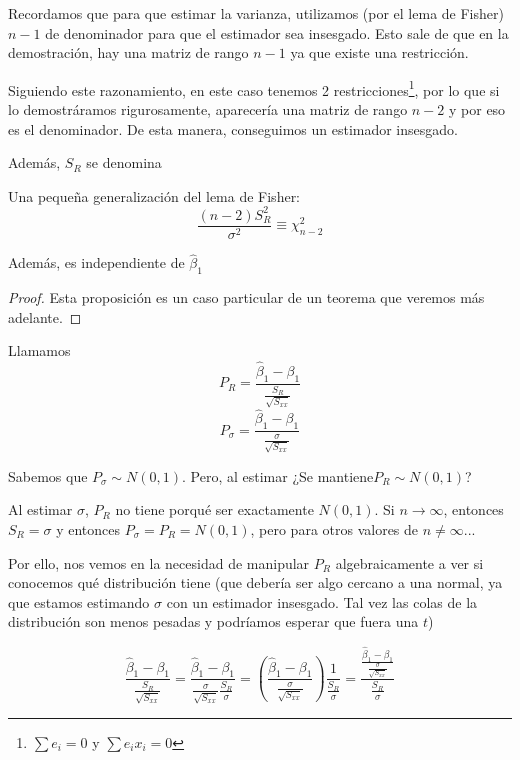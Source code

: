 \begin{expla}
Recordamos que para que estimar la varianza, utilizamos (por el lema de Fisher) $n-1$ de denominador para que el estimador sea insesgado. Esto sale de que en la demostración, hay una matriz de rango $n-1$ ya que existe una restricción.

Siguiendo este razonamiento, en este caso tenemos 2 restricciones\footnote{$\sum e_i = 0$ y $\sum e_ix_i = 0$}, por lo que si lo demostráramos rigurosamente, aparecería una matriz de rango $n-2$ y por eso es el denominador. De esta manera, conseguimos un estimador insesgado.

\end{expla}

Además, $S_R$ se denomina 

\begin{prop}
Una pequeña generalización del lema de Fisher:
\[
\frac{(n-2)S_{R}^2}{σ^2} \equiv \chi_{n-2}^2
\]

Además, es independiente de $\hat{β}_1$

\end{prop}



\begin{proof}
Esta proposición es un caso particular de un teorema que veremos más adelante.
\end{proof}


Llamamos
\[ P_{R} = \frac{\hat{β}_1-β_1}{\frac{S_R}{\sqrt{S_{xx}}}}\]
\[ P_σ = \frac{\hat{β}_1-β_1}{\frac{σ}{\sqrt{S_{xx}}}}\]

Sabemos que $P_σ \sim N(0,1)$. Pero, al estimar ¿Se mantiene$P_R \sim N(0,1)$?

Al estimar $σ$,  $P_{R}$ no tiene porqué ser exactamente $N(0,1)$. Si $n\to ∞$, entonces $S_R = σ$ y entonces $P_σ = P_R = N(0,1)$, pero para otros valores de $n≠∞$...

Por ello, nos vemos en la necesidad de manipular $P_R$ algebraicamente a ver si conocemos qué distribución tiene (que debería ser algo cercano a una normal, ya que estamos estimando $σ$ con un estimador insesgado. Tal vez las colas de la distribución son menos pesadas y podríamos esperar que fuera una $t$)

\label{Cuentas:largas}

\[
\displaystyle\frac{\hat{β}_1-β_1}{\displaystyle\frac{S_R}{\sqrt{S_{xx}}}} = \displaystyle\frac{\hat{β}_1-β_1}{\displaystyle\frac{σ}{\sqrt{S_{xx}}}\frac{S_R}{σ}} = \left( \displaystyle\frac{\hat{β}_1-β_1}{\displaystyle\frac{σ}{\sqrt{S_{xx}}}} \right)\displaystyle\frac{1}{\displaystyle\frac{S_R}{σ}} = \displaystyle\frac{ \displaystyle\frac{\hat{β}_1-β_1}{\frac{σ}{\sqrt{S_{xx}}}} }{\displaystyle\frac{S_R}{σ}}
\]

